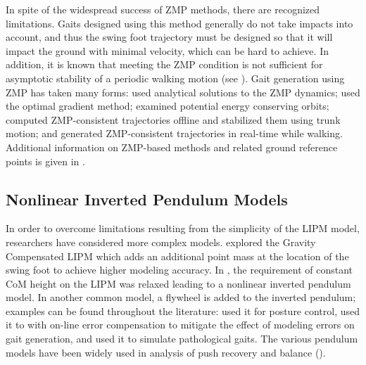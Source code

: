 In spite of the widespread success of ZMP methods, there are recognized limitations.
%
Gaits designed using this method generally do not take impacts into account, and thus the swing foot trajectory must be designed so that it will impact the ground with minimal velocity, which can be hard to achieve.
%
In addition, it is known that meeting the ZMP condition is not sufficient for asymptotic stability of a periodic walking motion (see \cite{Choi2005}).
%
Gait generation using ZMP has taken many forms:
%
\cite{Kurazume2003} used analytical solutions to the ZMP dynamics; \cite{Nagasaka1999} used the optimal gradient method;
%
\cite{Kajita1992} examined potential energy conserving orbits; \cite{Lim2002} computed ZMP-consistent trajectories offline and stabilized them using trunk motion;
%
and \cite{Nishiwaki2002} generated ZMP-consistent trajectories in real-time while walking.
%
Additional information on ZMP-based methods and related ground reference points is given in \cite{Goswami1999,Vukobratovic2004,Vukobratovic2006,Popovic2005}.

%

\subsection{Nonlinear Inverted Pendulum Models}

In order to overcome limitations resulting from the simplicity of the LIPM model, researchers have considered more complex models.
%
\cite{Park1998} explored the Gravity Compensated LIPM which adds an additional point mass at the location of the swing foot to achieve higher modeling accuracy.
%
In \cite{Pratt2007}, the requirement of constant CoM height on the LIPM was relaxed leading to a nonlinear inverted pendulum model.
%
In another common model, a flywheel is added to the inverted pendulum;
%
examples can be found throughout the literature:
%
\cite{Stephens2001} used it for posture control,
%
\cite{Takenaka2009} used it to with on-line error compensation to mitigate the effect of modeling errors on gait generation,
%
and \cite{Komura2005} used it to simulate pathological gaits.
%
The various pendulum models have been widely used in analysis of push recovery and balance (\cite{Takanishi1990,Hof2005,Hyon2007,Stephens2007}).


